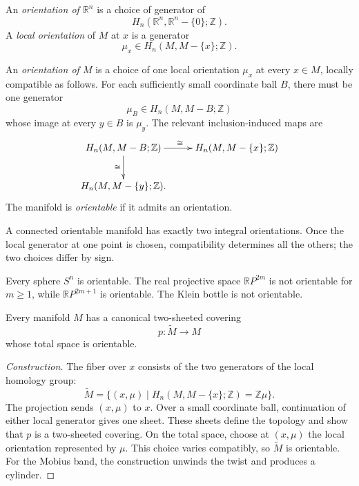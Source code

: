 \begin{definition}
\label{at-definition-manifold-orientation}
An \emph{orientation of $\mathbb{R}^n$}
is a choice of generator of
$$
H_n(\mathbb{R}^n,
\mathbb{R}^n-\{0\};\mathbb{Z}).
$$
A \emph{local orientation} of $M$ at $x$
is a generator
$$
\mu_x\in
H_n(M,M-\{x\};\mathbb{Z}).
$$

An \emph{orientation of $M$} is a choice
of one local orientation $\mu_x$ at every
$x\in M$, locally compatible as follows.
For each sufficiently small coordinate ball
$B$, there must be one generator
$$
\mu_B\in H_n(M,M-B;\mathbb{Z})
$$
whose image at every $y\in B$ is $\mu_y$.
The relevant inclusion-induced maps are
$$
\xymatrix{
H_n(M,M-B;\mathbb{Z})
  \ar[r]^\cong \ar[d]_\cong
  & H_n(M,M-\{x\};\mathbb{Z}) \\
H_n(M,M-\{y\};\mathbb{Z}).
}
$$
The manifold is \emph{orientable} if it
admits an orientation.
\end{definition}

\begin{remark}
\label{at-remark-two-orientations}
A connected orientable manifold has exactly
two integral orientations.  Once the local
generator at one point is chosen,
compatibility determines all the others;
the two choices differ by sign.
\end{remark}

\begin{example}
\label{at-example-orientable-manifolds}
Every sphere $S^n$ is orientable.  The real
projective space $\mathbb{R}P^{2m}$ is not
orientable for $m\geq 1$, while
$\mathbb{R}P^{2m+1}$ is orientable.  The
Klein bottle is not orientable.
\end{example}

\begin{proposition}
\label{at-proposition-orientation-cover}
Every manifold $M$ has a canonical
two-sheeted covering
$$
p:\widetilde M\longrightarrow M
$$
whose total space is orientable.
\end{proposition}

\begin{proof}[Construction]
The fiber over $x$ consists of the two
generators of the local homology group:
$$
\widetilde M
=
\bigl\{(x,\mu)\mid
H_n(M,M-\{x\};\mathbb{Z})
=\mathbb{Z}\mu\bigr\}.
$$
The projection sends $(x,\mu)$ to $x$.
Over a small coordinate ball, continuation
of either local generator gives one sheet.
These sheets define the topology and show
that $p$ is a two-sheeted covering.  On the
total space, choose at $(x,\mu)$ the local
orientation represented by $\mu$.  This
choice varies compatibly, so
$\widetilde M$ is orientable.  For the
Mobius band, the construction unwinds the
twist and produces a cylinder.
\end{proof}

